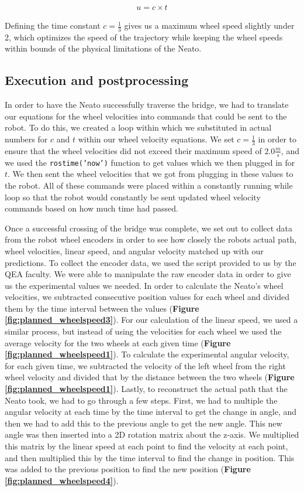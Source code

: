\begin{align*}
    u = c \times t
\end{align*}

Defining the time constant $c = \frac{1}{3}$ gives us a maximum wheel speed slightly under 2, which optimizes the speed of the trajectory while keeping the wheel speeds within bounds of the physical limitations of the Neato.

\subsection{Execution and postprocessing}
In order to have the Neato successfully traverse the bridge, we had to translate our equations for the wheel velocities into commands that could be sent to the robot. To do this, we created a loop within which we substituted in actual numbers for $c$ and $t$ within our wheel velocity equations. We set $c=\frac{1}{3}$ in order to ensure that the wheel velocities did not exceed their maximum speed of $2.0 \frac{m}{s}$, and we used the \texttt{rostime('now')} function to get values which we then plugged in for $t$. We then sent the wheel velocities that we got from plugging in these values to the robot. All of these commands were placed within a constantly running while loop so that the robot would constantly be sent updated wheel velocity commands based on how much time had passed. 

Once a successful crossing of the bridge was complete, we set out to collect data from the robot wheel encoders in order to see how closely the robots actual path, wheel velocities, linear speed, and angular velocity matched up with our predictions. To collect the encoder data, we used the script provided to us by the QEA faculty. We were able to manipulate the raw encoder data in order to give us the experimental values we needed. In order to calculate the Neato's wheel velocities, we subtracted consecutive position values for each wheel and divided them by the time interval between the values (\textbf{Figure \ref{fig:planned_wheelspeed3}}). For our calculation of the linear speed, we used a similar process, but instead of using the velocities for each wheel we used the average velocity for the two wheels at each given time (\textbf{Figure \ref{fig:planned_wheelspeed1}}). To calculate the experimental angular velocity, for each given time, we subtracted the velocity of the left wheel from the right wheel velocity and divided that by the distance between the two wheels (\textbf{Figure \ref{fig:planned_wheelspeed1}}). Lastly, to reconstruct the actual path that the Neato took, we had to go through a few steps. First, we had to multiple the angular velocity at each time by the time interval to get the change in angle, and then we had to add this to the previous angle to get the new angle. This new angle was then inserted into a 2D rotation matrix about the z-axis. We multiplied this matrix by the linear speed at each point to find the velocity at each point, and then multiplied this by the time interval to find the change in position. This was added to the previous position to find the new position (\textbf{Figure \ref{fig:planned_wheelspeed4}}). 

